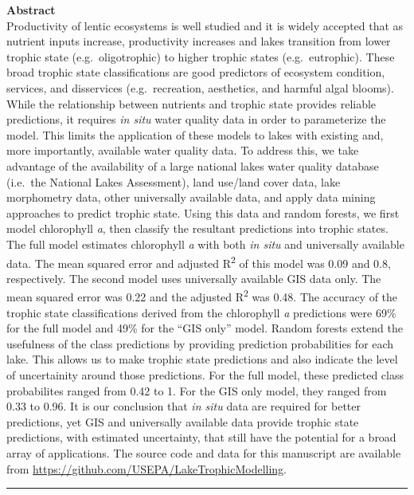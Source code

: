 \documentclass[11pt,]{article}
\begin{document}
\textbf{Abstract}\\Productivity of lentic ecosystems is well studied and
it is widely accepted that as nutrient inputs increase, productivity
increases and lakes transition from lower trophic state
(e.g.~oligotrophic) to higher trophic states (e.g.~eutrophic). These
broad trophic state classifications are good predictors of ecosystem
condition, services, and disservices (e.g.~recreation, aesthetics, and
harmful algal blooms). While the relationship between nutrients and
trophic state provides reliable predictions, it requires \emph{in situ}
water quality data in order to parameterize the model. This limits the
application of these models to lakes with existing and, more
importantly, available water quality data. To address this, we take
advantage of the availability of a large national lakes water quality
database (i.e.~the National Lakes Assessment), land use/land cover data,
lake morphometry data, other universally available data, and apply data
mining approaches to predict trophic state. Using this data and random
forests, we first model chlorophyll \emph{a}, then classify the
resultant predictions into trophic states. The full model estimates
chlorophyll \emph{a} with both \emph{in situ} and universally available
data. The mean squared error and adjusted R\textsuperscript{2} of this
model was 0.09 and 0.8, respectively. The second model uses universally
available GIS data only. The mean squared error was 0.22 and the
adjusted R\textsuperscript{2} was 0.48. The accuracy of the trophic
state classifications derived from the chlorophyll \emph{a} predictions
were 69\% for the full model and 49\% for the ``GIS only'' model. Random
forests extend the usefulness of the class predictions by providing
prediction probabilities for each lake. This allows us to make trophic
state predictions and also indicate the level of uncertainity around
those predictions. For the full model, these predicted class
probabilites ranged from 0.42 to 1. For the GIS only model, they ranged
from 0.33 to 0.96. It is our conclusion that \emph{in situ} data are
required for better predictions, yet GIS and universally available data
provide trophic state predictions, with estimated uncertainty, that
still have the potential for a broad array of applications. The source
code and data for this manuscript are available from
\url{https://github.com/USEPA/LakeTrophicModelling}.

\vspace{3mm}

\hrule
\end{document}
